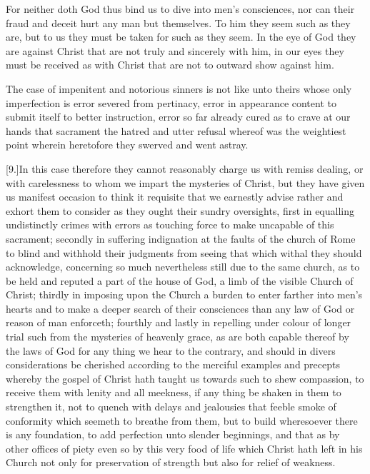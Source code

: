 For neither doth God thus bind us to dive into men’s consciences, nor can their fraud and deceit hurt any man but themselves. To him they seem such as they are, but to us they must be taken for such as they seem. In the eye of God they are against Christ that are not truly and sincerely with him, in our eyes they must be received as with Christ that are not to outward show against him.

The case of impenitent and notorious sinners is not like unto theirs whose only imperfection is error severed from pertinacy, error in appearance content to submit itself to better instruction, error so far already cured as to crave at our hands that sacrament the hatred and utter refusal whereof was the weightiest point wherein heretofore they swerved and went astray.

[9.]In this case therefore they cannot reasonably charge us with remiss dealing, or with carelessness to whom we impart the mysteries of Christ, but they have given us manifest occasion to think it requisite that we earnestly advise rather and exhort them to consider as they ought their sundry oversights, first in equalling undistinctly crimes with errors as touching force to make uncapable of this sacrament; secondly in suffering indignation at the faults of the church of Rome to blind and withhold their judgments from seeing that which withal they should acknowledge, concerning so much nevertheless still due to the same church, as to be held and reputed  a part of the house of God,
 a limb of the visible Church of Christ; thirdly in imposing upon the Church a burden to enter farther into men’s hearts and to make a deeper search of their consciences than any law of God or reason of man enforceth; fourthly and lastly in repelling under colour of longer trial such from the mysteries of heavenly grace, as are both capable thereof by the laws of God for any thing we hear to the contrary, and should in divers considerations be cherished according to the merciful examples and precepts whereby the gospel of Christ hath taught us towards such to shew compassion, to receive them with lenity and all meekness, if any thing be shaken in them to strengthen it, not to quench with delays and jealousies that feeble smoke of conformity which seemeth to breathe from them, but to build wheresoever there is any foundation, to add perfection unto slender beginnings, and that as by other offices of piety even so by this very food of life which Christ hath left in his Church not only for preservation of strength but also for relief of weakness.

